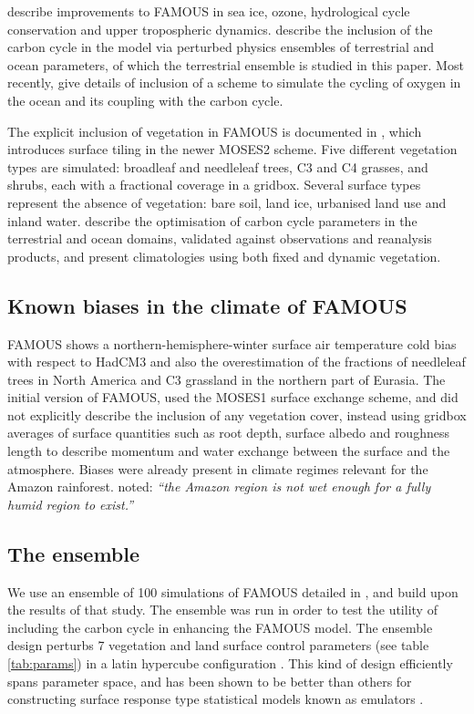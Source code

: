 \documentclass[esd, article]{copernicus} %
\begin{document}
\cite{smith2012famous} describe improvements to FAMOUS in sea ice, ozone, hydrological cycle conservation and upper tropospheric dynamics. \cite{williams2013optimising} describe the inclusion of the carbon cycle in the model via perturbed physics ensembles of terrestrial and ocean parameters, of which the terrestrial ensemble is studied in this paper. Most recently, \cite{williams2014oxygen} give details of inclusion of a scheme to simulate the cycling of oxygen in the ocean and its coupling with the carbon cycle.

The explicit inclusion of vegetation in FAMOUS is documented in \cite{williams2013optimising}, which introduces surface tiling in the newer MOSES2 scheme. Five different vegetation types are simulated: broadleaf and needleleaf trees, C3 and C4 grasses, and shrubs, each with a fractional coverage in a gridbox. Several surface types represent the absence of vegetation: bare soil, land ice, urbanised land use and inland water. \cite{williams2013optimising} describe the optimisation of carbon cycle parameters in the terrestrial and ocean domains, validated against observations and reanalysis products, and present climatologies using both fixed and dynamic vegetation.  

\subsection{Known biases in the climate of FAMOUS}\label{ssec:biases}

FAMOUS shows a northern-hemisphere-winter surface air temperature cold bias with respect to HadCM3 and also the overestimation of the fractions of needleleaf trees in North America and C3 grassland in the northern part of Eurasia. The initial version of FAMOUS, used the MOSES1 surface exchange scheme, and did not explicitly describe the inclusion of any vegetation cover, instead using gridbox averages of surface quantities such as root depth, surface albedo and roughness length to describe momentum and water exchange between the surface and the atmosphere. Biases were already present in climate regimes \citep{gnanadesikan2006diagnosing} relevant for the Amazon rainforest. \cite{smith2008famous} noted: \emph{``the Amazon region is not wet enough for a fully humid region to exist.''}

\subsection{The ensemble}
We use an ensemble of 100 simulations of FAMOUS detailed in \cite{williams2013optimising}, and build upon the results of that study. The ensemble was run in order to test the utility of including the carbon cycle in enhancing the FAMOUS model. The ensemble design perturbs 7 vegetation and land surface control parameters (see table \ref{tab:params}) in a latin hypercube configuration \citep{mckay1979comparison}. This kind of design efficiently spans parameter space, and has been shown to be better than others for constructing surface response type statistical models known as emulators \citep{urban2010comparison}.
\end{document}
